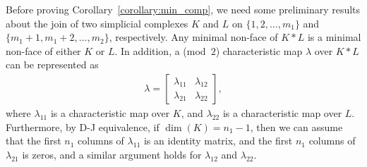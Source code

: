 \documentclass[11pt]{amsart}
\theoremstyle{plain}
\numberwithin{equation}{section}
\theoremstyle{definition}
\begin{document}
Before proving Corollary~\ref{corollary:min_comp}, we need some preliminary results about the join of two simplicial complexes $K$ and $L$ on $\{1, 2, \ldots, m_1\}$ and $\{m_1+1, m_1+2, \ldots, m_2\}$, respectively.
Any minimal non-face of $K*L$ is a minimal non-face of either  $K$ or $L$.
In addition, a (mod~$2$) characteristic map $\lambda$ over $K*L$ can be represented as \begin{align*}
	\lambda = \begin{bmatrix}
		\lambda_{11} & \lambda_{12} \\
		\lambda_{21} & \lambda_{22}
	\end{bmatrix},
\end{align*}
where $\lambda_{11}$ is a characteristic map over $K$, and $\lambda_{22}$ is a characteristic map over $L$.
Furthermore, by D-J equivalence, if $\dim(K)=n_1-1$, then we can assume that the first $n_1$ columns of $\lambda_{11}$ is an identity matrix, and the first $n_1$ columns of $\lambda_{21}$ is zeros, and a similar argument holds for $\lambda_{12}$ and $\lambda_{22}$.
\end{document}
